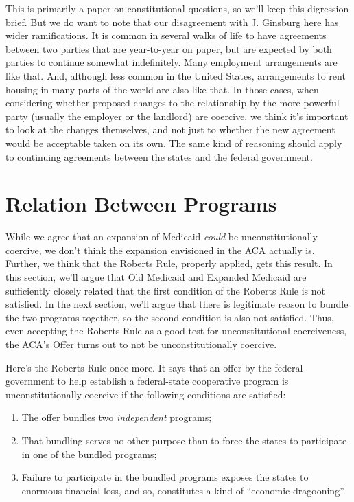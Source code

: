 \documentclass[
  11pt,
  letterpaper,
  DIV=11,
  numbers=noendperiod,
  twoside]{scrartcl}
\providecommand{\tightlist}{%
  \setlength{\itemsep}{0pt}\setlength{\parskip}{0pt}}
\begin{document}
This is primarily a paper on constitutional questions, so we'll keep
this digression brief. But we do want to note that our disagreement with
J. Ginsburg here has wider ramifications. It is common in several walks
of life to have agreements between two parties that are year-to-year on
paper, but are expected by both parties to continue somewhat
indefinitely. Many employment arrangements are like that. And, although
less common in the United States, arrangements to rent housing in many
parts of the world are also like that. In those cases, when considering
whether proposed changes to the relationship by the more powerful party
(usually the employer or the landlord) are coercive, we think it's
important to look at the changes themselves, and not just to whether the
new agreement would be acceptable taken on its own. The same kind of
reasoning should apply to continuing agreements between the states and
the federal government.

\section{Relation Between Programs}\label{relation-between-programs}

While we agree that an expansion of Medicaid \emph{could} be
unconstitutionally coercive, we don't think the expansion envisioned in
the ACA actually is. Further, we think that the Roberts Rule, properly
applied, gets this result. In this section, we'll argue that Old
Medicaid and Expanded Medicaid are sufficiently closely related that the
first condition of the Roberts Rule is not satisfied. In the next
section, we'll argue that there is legitimate reason to bundle the two
programs together, so the second condition is also not satisfied. Thus,
even accepting the Roberts Rule as a good test for unconstitutional
coerciveness, the ACA's Offer turns out to not be unconstitutionally
coercive.

Here's the Roberts Rule once more. It says that an offer by the federal
government to help establish a federal-state cooperative program is
unconstitutionally coercive if the following conditions are satisfied:

\begin{enumerate}
\def\labelenumi{\arabic{enumi}.}
\tightlist
\item
  The offer bundles two \emph{independent} programs;
\item
  That bundling serves no other purpose than to force the states to
  participate in one of the bundled programs;
\item
  Failure to participate in the bundled programs exposes the states to
  enormous financial loss, and so, constitutes a kind of ``economic
  dragooning''.
\end{enumerate}
\end{document}
